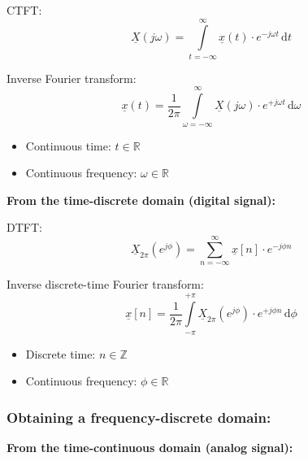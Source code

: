 \begin{refsection}
\begin{minipage}{0.45\linewidth}
	\vspace{0.5em}
	
	\acf{CTFT}:
	\begin{equation*}
		\underline{X}(j \omega) = \int\limits_{t = -\infty}^{\infty} \underline{x}(t) \cdot e^{-j \omega t} \, \mathrm{d} t
	\end{equation*}
	
	Inverse Fourier transform:
	\begin{equation*}
		\underline{x}(t) = \frac{1}{2 \pi} \int\limits_{\omega = -\infty}^{\infty} \underline{X}(j \omega) \cdot e^{+ j \omega t} \, \mathrm{d} \omega
	\end{equation*}
	
	\begin{itemize}
		\item Continuous time: $t \in \mathbb{R}$
		\item Continuous frequency: $\omega \in \mathbb{R}$
	\end{itemize}
\end{minipage}
\hfill
\begin{minipage}{0.45\linewidth}
	\textbf{From the time-discrete domain (digital signal):}
	
	\vspace{0.5em}
	
	\acf{DTFT}:
	\begin{equation*}
		\underline{X}_{2\pi}(e^{j \phi}) = \sum\limits_{n = -\infty}^{\infty} \underline{x}[n] \cdot e^{- j \phi n}
	\end{equation*}
	
	Inverse discrete-time Fourier transform:
	\begin{equation*}
		\underline{x}[n] = \frac{1}{2 \pi} \int\limits_{- \pi}^{+ \pi} \underline{X}_{2\pi}(e^{j \phi}) \cdot e^{+ j \phi n} \, \mathrm{d} \phi
	\end{equation*}
	
	\begin{itemize}
		\item Discrete time: $n \in \mathbb{Z}$
		\item Continuous frequency: $\phi \in \mathbb{R}$
	\end{itemize}
\end{minipage}

\subsubsection{Obtaining a frequency-discrete domain:}

\begin{minipage}{0.45\linewidth}
	\textbf{From the time-continuous domain (analog signal):}
	

\end{minipage}
\end{refsection}
